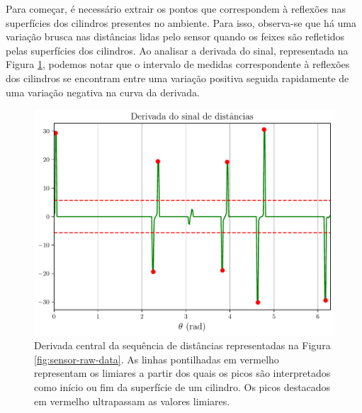 Para começar, é necessário extrair os pontos que correspondem à reflexões nas 
superfícies dos cilindros presentes no ambiente. Para isso, observa-se que há uma variação brusca nas distâncias lidas pelo sensor quando os feixes são 
refletidos pelas superfícies dos cilindros. Ao analisar a derivada do sinal, 
representada na Figura \ref{fig:sensor-derivative}, podemos notar que o intervalo de medidas 
correspondente à reflexões dos cilindros se encontram entre uma variação 
positiva seguida rapidamente de uma variação negativa na curva da derivada.
\begin{figure}[h]
  \centering
  \includegraphics[width=.6\textwidth]{figs/signal_derivative.pdf}
  \caption{Derivada central da sequência de distâncias representadas na Figura \ref{fig:sensor-raw-data}. As linhas pontilhadas em vermelho 
  representam os limiares a partir dos quais os picos são interpretados 
  como início ou fim da superfície de um cilindro. Os picos destacados 
  em vermelho ultrapassam as valores limiares.}
  \label{fig:sensor-derivative}
\end{figure}

